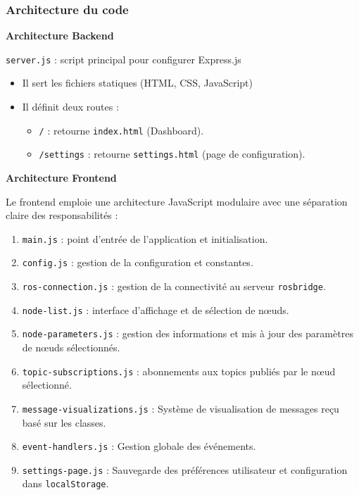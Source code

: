 \documentclass{name}
\begin{document}
\subsubsection{Architecture du code}

\textbf{Architecture Backend}

\texttt{server.js} : script principal pour configurer Express.js

\begin{itemize}
    \item Il sert les fichiers statiques (HTML, CSS, JavaScript)
    \item Il définit deux routes : 
    \begin{itemize}
        \item \texttt{/} : retourne \texttt{index.html} (Dashboard).
        \item \texttt{/settings} : retourne \texttt{settings.html} (page de configuration).
    \end{itemize}
\end{itemize}

\textbf{Architecture Frontend}

Le frontend emploie une architecture JavaScript modulaire avec une séparation claire des responsabilités :

\begin{enumerate}
    \item \texttt{main.js} : point d'entrée de l'application et initialisation.
    \item \texttt{config.js} : gestion de la configuration et constantes.
    \item \texttt{ros-connection.js} : gestion de la connectivité au serveur \texttt{rosbridge}.
    \item \texttt{node-list.js} : interface d'affichage et de sélection de nœuds.
    \item \texttt{node-parameters.js} : gestion des informations et mis à jour des paramètres de nœuds sélectionnés.
    \item \texttt{topic-subscriptions.js} : abonnements aux topics publiés par le nœud sélectionné.
    \item \texttt{message-visualizations.js} : Système de visualisation de messages reçu basé sur les classes.
    \item \texttt{event-handlers.js} : Gestion globale des événements.
    \item \texttt{settings-page.js} : Sauvegarde des préférences utilisateur et configuration dans \texttt{localStorage}.
\end{enumerate}
\end{document}
